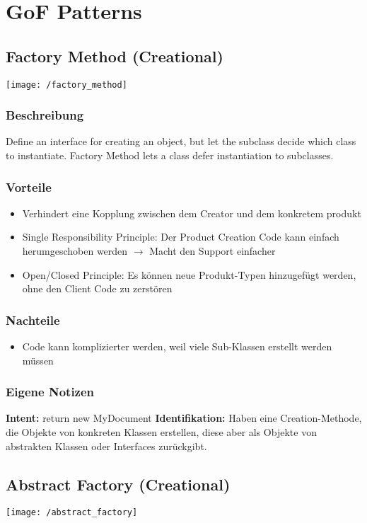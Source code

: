 
\section{GoF Patterns}
\subsection{Factory Method (Creational)}
\texttt{[image: /factory\_method]}
\subsubsection{Beschreibung}
Define an interface for creating an object, but let the subclass decide which class to instantiate. Factory Method lets a class defer instantiation to subclasses.
\subsubsection{Vorteile}
\begin{itemize}[topsep=0pt]
    \itemsep -0.4em
    \item Verhindert eine Kopplung zwischen dem Creator und dem konkretem produkt
    \item Single Responsibility Principle: Der Product Creation Code kann einfach herumgeschoben werden $\rightarrow$ Macht den Support einfacher
    \item Open/Closed Principle: Es können neue Produkt-Typen hinzugefügt werden, ohne den Client Code zu zerstören
\end{itemize}
\subsubsection{Nachteile}
\begin{itemize}[topsep=0pt]
    \itemsep -0.4em
    \item Code kann komplizierter werden, weil viele Sub-Klassen erstellt werden müssen
\end{itemize}
\subsubsection{Eigene Notizen}
\textbf{Intent:} return new MyDocument
\textbf{Identifikation:} Haben eine Creation-Methode, die Objekte von konkreten Klassen erstellen, diese aber als Objekte von abstrakten Klassen oder Interfaces zurückgibt.

\subsection{Abstract Factory (Creational)}
\texttt{[image: /abstract\_factory]}
